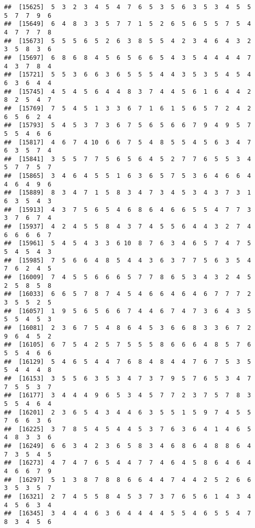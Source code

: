 \documentclass[
]{book}
\begin{document}
\begin{verbatim}
##  [15625]  5  3  2  3  4  5  4  7  6  5  3  5  6  3  5  3  4  5  5  5  7  7  9  6
##  [15649]  6  4  8  3  3  5  7  7  1  5  2  6  5  6  5  5  7  5  4  4  7  7  7  8
##  [15673]  5  5  5  6  5  2  6  3  8  5  5  4  2  3  4  6  4  3  2  3  5  8  3  6
##  [15697]  6  8  6  8  4  5  6  5  6  6  5  4  3  5  4  4  4  4  7  4  3  7  8  4
##  [15721]  5  5  3  6  6  3  6  5  5  5  4  4  3  5  3  5  4  5  4  6  3  6  4  4
##  [15745]  4  5  4  5  6  4  4  8  3  7  4  4  5  6  1  6  4  4  2  8  2  5  4  7
##  [15769]  7  5  4  5  1  3  3  6  7  1  6  1  5  6  5  7  2  4  2  6  5  6  2  4
##  [15793]  5  4  5  3  7  3  6  7  5  6  5  6  6  7  9  4  9  5  7  5  5  4  6  6
##  [15817]  4  6  7  4 10  6  6  7  5  4  8  5  5  4  5  6  3  4  7  6  3  5  7  4
##  [15841]  3  5  5  7  7  5  6  5  6  4  5  2  7  7  6  5  5  3  4  5  7  7  5  7
##  [15865]  3  4  6  4  5  5  1  6  3  6  5  7  5  3  6  4  6  6  4  4  6  4  9  6
##  [15889]  8  3  4  7  1  5  8  3  4  7  3  4  5  3  4  3  7  3  1  6  3  5  4  3
##  [15913]  4  3  7  5  6  5  4  6  8  6  4  6  6  5  5  4  7  7  3  3  7  6  7  4
##  [15937]  4  2  4  5  5  8  4  3  7  4  5  5  6  4  4  3  2  7  4  6  6  6  6  7
##  [15961]  5  4  5  4  3  3  6 10  8  7  6  3  4  6  5  7  4  7  5  5  4  5  4  3
##  [15985]  7  5  6  6  4  8  5  4  4  3  6  3  7  7  5  6  3  5  4  7  6  2  4  5
##  [16009]  7  4  5  5  6  6  6  5  7  7  8  6  5  3  4  3  2  4  5  2  5  8  5  8
##  [16033]  6  6  5  7  8  7  4  5  4  6  6  4  6  4  6  7  7  7  2  3  5  5  2  5
##  [16057]  1  9  5  6  5  6  6  7  4  4  6  7  4  7  3  6  4  3  5  5  5  4  5  3
##  [16081]  2  3  6  7  5  4  8  6  4  5  3  6  6  8  3  3  6  7  2  9  6  4  5  2
##  [16105]  6  7  5  4  2  5  7  5  5  5  8  6  6  6  4  8  5  7  6  5  5  4  6  6
##  [16129]  5  4  6  5  4  4  7  6  8  4  8  4  4  7  6  7  5  3  5  5  4  4  4  8
##  [16153]  3  5  5  6  3  5  3  4  7  3  7  9  5  7  6  5  3  4  7  7  5  5  3  7
##  [16177]  3  4  4  4  9  6  5  3  4  5  7  7  2  3  7  5  7  8  3  5  5  4  6  4
##  [16201]  2  3  6  5  4  3  4  4  6  3  5  5  1  5  9  7  4  5  5  7  6  6  3  6
##  [16225]  3  7  8  5  4  5  4  4  5  3  7  6  3  6  4  1  4  6  5  4  8  3  3  6
##  [16249]  6  6  3  4  2  3  6  5  8  3  4  6  8  6  4  8  8  6  4  7  3  5  4  5
##  [16273]  4  7  4  7  6  5  4  4  7  7  4  6  4  5  8  6  4  6  4  4  6  6  7  9
##  [16297]  5  1  3  8  7  8  8  6  6  4  4  7  4  4  2  5  2  6  6  3  5  3  5  7
##  [16321]  2  7  4  5  5  8  4  5  3  7  3  7  6  5  6  1  4  3  4  4  5  6  3  4
##  [16345]  3  4  4  4  6  3  6  4  4  4  4  5  5  4  6  5  5  4  7  8  3  4  5  6

\end{verbatim}
\end{document}
